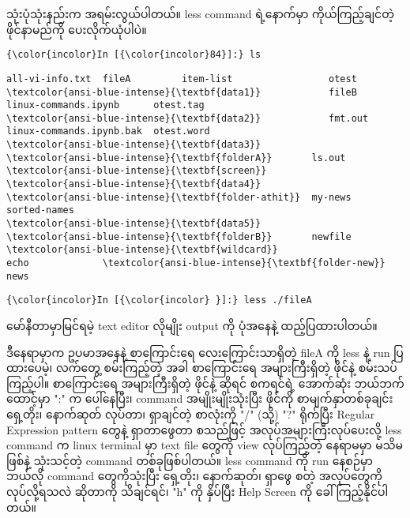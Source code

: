 \documentclass[11pt]{article}
\begin{document}
သုံးပုံသုံးနည်းက အရမ်းလွယ်ပါတယ်။ less command ရဲ့နောက်မှာ
ကိုယ်ကြည့်ချင်တဲ့ ဖိုင်နာမည်ကို ပေးလိုက်ယုံပါပဲ။

    \begin{Verbatim}[commandchars=\\\{\}]
{\color{incolor}In [{\color{incolor}84}]:} ls
\end{Verbatim}

    \begin{Verbatim}[commandchars=\\\{\}]
all-vi-info.txt  fileA         item-list                 otest
\textcolor{ansi-blue-intense}{\textbf{data1}}            fileB         linux-commands.ipynb      otest.tag
\textcolor{ansi-blue-intense}{\textbf{data2}}            fmt.out       linux-commands.ipynb.bak  otest.word
\textcolor{ansi-blue-intense}{\textbf{data3}}            \textcolor{ansi-blue-intense}{\textbf{folderA}}       ls.out                    \textcolor{ansi-blue-intense}{\textbf{screen}}
\textcolor{ansi-blue-intense}{\textbf{data4}}            \textcolor{ansi-blue-intense}{\textbf{folder-athit}}  my-news                   sorted-names
\textcolor{ansi-blue-intense}{\textbf{data5}}            \textcolor{ansi-blue-intense}{\textbf{folderB}}       newfile                   \textcolor{ansi-blue-intense}{\textbf{wildcard}}
echo             \textcolor{ansi-blue-intense}{\textbf{folder-new}}    news

    \end{Verbatim}

    \begin{Verbatim}[commandchars=\\\{\}]
{\color{incolor}In [{\color{incolor} }]:} less ./fileA
\end{Verbatim}

    မော်နီတာမှာမြင်ရမဲ့ text editor လိုမျိုး output ကို ပုံအနေနဲ့
ထည့်ပြထားပါတယ်။

    

    ဒီနေရာမှာက ဥပမာအနေနဲ့ စာကြောင်းရေ လေးကြောင်းသာရှိတဲ့ fileA ကို less နဲ့
run ပြထားပေမဲ့၊ လက်တွေ့ စမ်းကြည့်တဲ့ အခါ စာကြောင်းရေ အများကြီးရှိတဲ့
ဖိုင်နဲ့ စမ်းသပ်ကြည့်ပါ။ စာကြောင်းရေ အများကြီးရှိတဲ့ ဖိုင်နဲ့ ဆိုရင်
စကရင်ရဲ့ အောက်ဆုံး ဘယ်ဘက်ထောင့်မှာ ":" က ပေါ်နေပြီး၊ command
အမျိုးမျိုးသုံးပြီး ဖိုင်ကို စာမျက်နှာတစ်ခုချင်း ရှေ့တိုး၊ နောက်ဆုတ်
လုပ်တာ၊ ရှာချင်တဲ့ စာလုံးကို "/" (သို့) "?" ရိုက်ပြီး Regular Expression
pattern တွေနဲ့ ရှာတာဖွေတာ စသည်ဖြင့် အလုပ်အများကြီးလုပ်ပေးလို့ less
command က linux terminal မှာ text file တွေကို view လုပ်ကြည့်တဲ့ နေရာမမှာ
မသိမဖြစ်နဲ့ သုံးသင့်တဲ့ command တစ်ခုဖြစ်ပါတယ်။ less command ကို run
နေစဉ်မှာ ဘယ်လို command တွေကိုသုံးပြီး ရှေ့တိုး၊ နောက်ဆုတ်၊ ရှာဖွေ စတဲ့
အလုပ်တွေကို လုပ်လို့ရသလဲ ဆိုတာကို သိချင်ရင်၊ "h" ကို နှိပ်ပြီး Help
Screen ကို ခေါ်ကြည့်နိုင်ပါတယ်။
\end{document}
